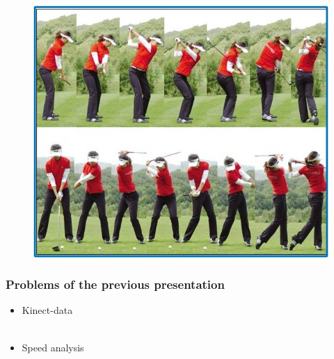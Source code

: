 \documentclass{beamer}
\begin{document}
\begin{frame}


\begin{figure}
\includegraphics[width=0.76\linewidth]{frames.jpg}
\end{figure}


\end{frame}


\begin{frame}
\frametitle{Problems of the previous presentation}
\begin{itemize}
\item Kinect-data\\~\\
\item Speed analysis
\end{itemize}

\end{frame}
\end{document}
